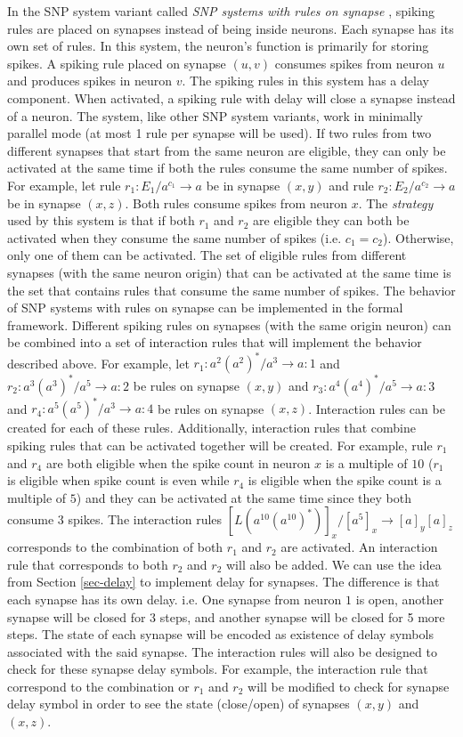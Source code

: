 \documentclass[a4paper]{article}
\theoremstyle{definition}
\newcommand{\ra}{\rightarrow}
\begin{document}
In the SNP system variant called \emph{SNP systems with rules on synapse} 
\cite{song-2014-rules-on-synapses}, spiking rules are placed on synapses instead of being inside
neurons. Each synapse has its own set of rules. In this system, the neuron's function is primarily 
for storing spikes. A spiking rule placed on synapse $(u,v)$ consumes spikes from neuron $u$ and
produces spikes in neuron $v$. The spiking rules in this system has a delay component. When 
activated, a spiking rule with delay will close a synapse instead of a neuron. The system, like 
other SNP system variants, work in minimally parallel mode (at most 1 rule per synapse will be used).
If two rules from two different synapses that start from the same neuron are eligible, they can only
be activated at the same time if both the rules consume the same number of spikes. For example,
let rule $r_1: E_1/a^{c_1} \ra a$ be in synapse $(x,y)$ and rule $r_2: E_2/a^{c_2} \ra a$ be in
synapse $(x,z)$. Both rules consume spikes from neuron $x$. The \emph{strategy} used by this 
system is that if both $r_1$ and $r_2$ are eligible they can both be activated when they consume the
same number of spikes (i.e. $c_1 = c_2$). Otherwise, only one of them can be activated. The set of
eligible rules from different synapses (with the same neuron origin) that can be activated at the 
same time is the set that contains rules that consume the same number of spikes. The behavior of 
SNP systems with rules on synapse can be implemented in the formal framework. Different spiking 
rules on synapses (with the same origin neuron) can be combined into a set of interaction rules that
will implement the behavior described above. For example, let $r_1: a^2(a^2)^*/a^3 \ra a:1$  and
$r_2: a^3(a^3)^*/a^5 \ra a:2$ be rules on synapse $(x,y)$ and $r_3: a^4(a^4)^*/a^5 \ra a:3$ and 
$r_4: a^5(a^5)^*/a^3 \ra a:4$ be rules on synapse $(x,z)$. Interaction rules can be created for
each of these rules. Additionally, interaction rules that combine spiking rules that can be 
activated together will be created. For example, rule $r_1$ and $r_4$ are both eligible when the
spike count in neuron $x$ is a multiple of $10$ ($r_1$ is eligible when spike count is even while
$r_4$ is eligible when the spike count is a multiple of $5$) and they can be activated at the same
time since they both consume $3$ spikes. The interaction rules $[L(a^{10}(a^{10})^*)]_x/[a^5]_x \ra 
[a]_y[a]_z$ corresponds to the combination of both $r_1$ and $r_2$ are activated. An interaction
rule that corresponds to both $r_2$ and $r_2$ will also be added. We can use the idea from 
Section \ref{sec-delay} to implement delay for synapses. The difference is that each synapse has 
its own delay. i.e. One synapse from neuron $1$ is open, another synapse will be closed for
3 steps, and another synapse will be closed for 5 more steps. The state of each synapse will be
encoded as existence of delay symbols associated with the said synapse. The interaction rules 
will also be designed to check for these synapse delay symbols. For example, the interaction rule
that correspond to the combination or $r_1$ and $r_2$ will be modified to check for synapse 
delay symbol in order to see the state (close/open) of synapses $(x,y)$ and $(x,z)$. 
\end{document}

